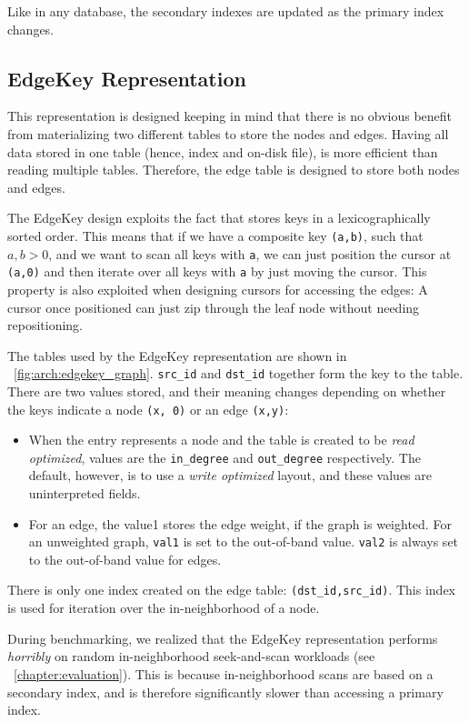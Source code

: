 Like in any database, the secondary indexes are updated as the primary index changes.

\subsection{EdgeKey Representation}
\label{arch:edgekey}
This representation is designed keeping in mind that there is no obvious benefit from materializing two different tables to store the nodes and edges.
Having all data stored in one table (hence, index and on-disk file), is more efficient than reading multiple tables.
Therefore, the edge table is designed to store both nodes and edges.

The EdgeKey design exploits the fact that \wt{} stores keys in a lexicographically sorted order.
This means that if we have a composite key \texttt{(a,b)}, such that $a,b > 0$, and we want to scan all keys with \texttt{a}, we can just position the cursor at \texttt{(a,0)} and then iterate over all keys with \texttt{a} by just moving the cursor.
This property is also exploited when designing cursors for accessing the edges: A cursor once positioned can just zip through the leaf node without needing repositioning.

The tables used by the EdgeKey representation are shown in ~\autoref{fig:arch:edgekey_graph}.
\texttt{src\_id} and \texttt{dst\_id} together form the key to the table.
There are two values stored, and their meaning changes depending on whether the keys indicate a node \texttt{(x, 0)} or an edge \texttt{(x,y)}:
\begin{itemize}
  \item When the entry represents a node and the table is created to be \emph{read optimized}, values are the \texttt{in\_degree} and \texttt{out\_degree} respectively. The default, however, is to use a \emph{write optimized} layout, and these values are uninterpreted fields.
  \item For an edge, the value1 stores the edge weight, if the graph is weighted. For an unweighted graph, \texttt{val1} is set to the out-of-band value. \texttt{val2} is always set to the out-of-band value for edges.
\end{itemize}

There is only one index created on the edge table: \texttt{(dst\_id,src\_id)}.
This index is used for iteration over the in-neighborhood of a node.

During benchmarking, we realized that the EdgeKey representation performs \emph{horribly} on random in-neighborhood seek-and-scan workloads (see ~\autoref{chapter:evaluation}).
This is because in-neighborhood scans are based on a secondary index, and is therefore significantly slower than accessing a primary index.


